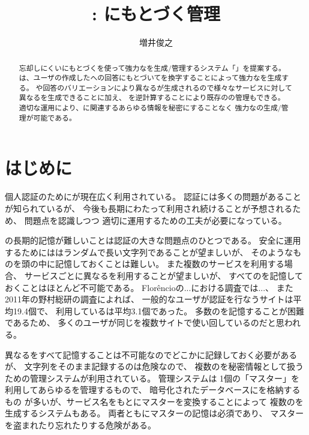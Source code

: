 \documentclass[twoside]{wiss}
\begin{document}
\title{{\EP}: {\EM}にもとづく{\PW}管理}

\author{増井俊之}

\begin{abstract}
忘却しにくい{\EM}にもとづく{\SQ}を使って強力な{\PW}を生成/管理するシステム「\textsf{\EP}」を提案する。
{\EP}は、ユーザの作成した{\SQ}への回答にもとづいて{\SS}を換字することによって強力な{\PW}を生成する。
{\SS}や回答のバリエーションにより異なる{\PW}が生成されるので様々なサービスに対して異なる{\PW}を生成できることに加え、
{\SS}を逆計算することにより既存の{\PW}の管理もできる。
適切な運用により、{\PW}に関連するあらゆる情報を秘密にすることなく
強力な{\PW}の生成/管理が可能である。
\end{abstract}

\maketitle

\section{はじめに}

個人認証のために{\PW}が現在広く利用されている。
{\PW}認証には多くの問題があることが知られているが\cite{増井_ユニマガ}、
今後も長期にわたって利用され続けることが予想されるため、
問題点を認識しつつ
適切に運用するための工夫が必要になっている。

{\PW}の長期的記憶が難しいことは{\PW}認証の大きな問題点のひとつである。
安全に運用するためには{\PW}はランダムで長い文字列であることが望ましいが、
そのようなものを頭の中に記憶しておくことは難しい。
また複数のサービスを利用する場合、
サービスごとに異なる{\PW}を利用することが望ましいが、
すべての{\PW}を記憶しておくことはほとんど不可能である。
%
Flor\^{e}ncioの...における調査では...\cite{Florencio:2007:LSW:1242572.1242661}、
また2011年の野村総研の調査によれば、
一般的なユーザが{\PW}認証を行なうサイトは平均19.4個で、
利用している{\PW}は平均3.1個であった\cite{野村総研}。
多数の{\PW}を記憶することが困難であるため、
多くのユーザが同じ{\PW}を複数サイトで使い回しているのだと思われる。

異なる{\PW}をすべて記憶することは不可能なのでどこかに記録しておく必要があるが、
{\PW}文字列をそのまま記録するのは危険なので、
複数の{\PW}を秘密情報として扱うための{\PW}管理システムが利用されている。
{\PW}管理システムは
1個の「マスター{\PW}」を利用してあらゆる{\PW}を管理するもので、
暗号化されたデータベースに{\PW}を格納するもの%
\cite{OnePassword}%
\cite{Dashlane}%
\cite{ミルパス}%
\cite{LastPass}%
\cite{KeyPass}%
\cite{NortonIDSafe}%
\cite{IDManager}%
が多いが、サービス名をもとにマスター{\PW}を変換することによって
複数の{\PW}を生成するシステム\cite{SuperGenPass}もある。
両者ともにマスター{\PW}の記憶は必須であり、
マスター{\PW}を盗まれたり忘れたりする危険がある。
\end{document}
